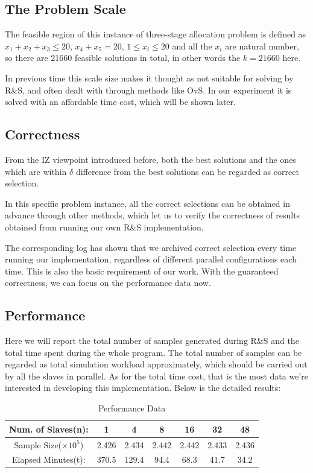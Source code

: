 \documentclass[12pt,a4paper]{report}
\begin{document}
\subsection{The Problem Scale}

The feasible region of this instance of three-stage allocation problem is defined as $x_1 + x_2 + x_3 \leqslant 20$, $x_4 + x_5 = 20$, $1 \leqslant x_i \leqslant 20$ and all the $x_i$ are natural number, so there are 21660 feasible solutions in total, in other words the $k = 21660$ here.

In previous time this scale size makes it thought as not suitable for solving by R\&S, and often dealt with through methods like OvS. In our experiment it is solved with an affordable time cost, which will be shown later.

\subsection{Correctness}

From the IZ viewpoint introduced before, both the best solutions and the ones which are within $\delta$ difference from the best solutions can be regarded as correct selection.

In this specific problem instance, all the correct selections can be obtained in advance through other methods, which let us to verify the correctness of results obtained from running our own R\&S implementation.

The corresponding log has shown that we archived correct selection every time running our implementation, regardless of different parallel configurations each time. This is also the basic requirement of our work. With the guaranteed correctness, we can focus on the performance data now.

\subsection{Performance}

Here we will report the total number of samples generated during R\&S and the total time spent during the whole program. The total number of samples can be regarded as total simulation workload approximately, which should be carried out by all the slaves in parallel. As for the total time cost, that is the most data we're interested in developing this implementation. Below is the detailed results:

\begin{table}[ht]
\begin{center}
\begin{tabular}{|c|c|c|c|c|c|c|}
\hline
Num. of Slaves(n): & 1 & 4 & 8 & 16 & 32 & 48 \\
\hline
Sample Size($\times 10^5$) & 2.426 & 2.434 & 2.442 & 2.442 & 2.433 & 2.436\\
\hline
Elapsed Minutes(t): & 370.5 & 129.4 & 94.4 & 68.3 & 41.7 & 34.2 \\
\hline
\end{tabular} \\
\caption{Performance Data}
\end{center}
\end{table}
\end{document}
